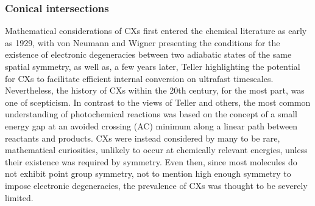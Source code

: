 \documentclass[9pt,bestpractices]{livecoms}
\begin{document}
\subsubsection{Conical intersections}
\label{ch2_cx}

Mathematical considerations of CXs first entered the chemical literature as early as 1929, with von Neumann and Wigner\cite{vonneumann1929eigenvalues} presenting the conditions for the existence of electronic degeneracies between two adiabatic states of the same spatial symmetry, as well as, a few years later, Teller\cite{teller_crossing_1937} highlighting the potential for CXs to facilitate efficient internal conversion on ultrafast timescales.
Nevertheless, the history of CXs within the 20th century, for the most part, was one of scepticism.
In contrast to the views of Teller and others,\cite{zimmerman_molecular_1966,michl_physical_1974} the most common understanding of photochemical reactions was based on the concept of a small energy gap at an avoided crossing (AC) minimum\cite{van_der_lugt_symmetry_1969} along a linear path between reactants and products.\cite{schapiro_using_2011}
CXs were instead considered by many to be rare, mathematical curiosities, unlikely to occur at chemically relevant energies, unless their existence was required by symmetry.\cite{levine2007isomerization}
Even then, since most molecules do not exhibit point group symmetry, not to mention high enough symmetry to impose electronic degeneracies, the prevalence of CXs was thought to be severely limited.\cite{yarkony_nonadiabatic_2012}
\end{document}
